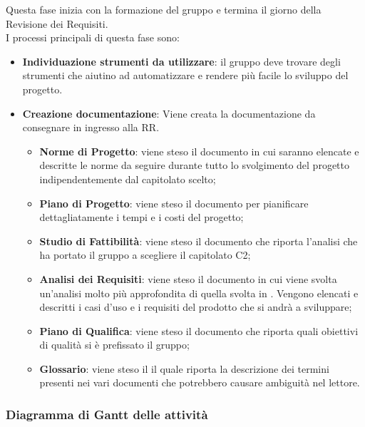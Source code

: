 	Questa fase inizia con la formazione del gruppo e termina il giorno della Revisione dei Requisiti. \\
	I processi principali di questa fase sono: 
	\begin{itemize}
		\item \textbf{Individuazione strumenti da utilizzare}: il gruppo deve trovare degli strumenti che aiutino ad automatizzare e rendere più facile lo sviluppo del progetto.
		\item \textbf{Creazione documentazione}: Viene creata la documentazione da consegnare in ingresso alla RR.
		\att
		\begin{itemize}
			\item \textbf{Norme di Progetto}: viene steso il documento \NPdocRR in cui saranno elencate e descritte le norme da seguire durante tutto lo svolgimento del progetto indipendentemente dal capitolato scelto;
			\item \textbf{Piano di Progetto}: viene steso il documento \PPdocRR per pianificare dettagliatamente i tempi e i costi del progetto;
			\item \textbf{Studio di Fattibilità}: viene steso il documento \SFdocRR che riporta l'analisi che ha portato il gruppo a scegliere il capitolato C2;
			\item \textbf{Analisi dei Requisiti}: viene steso il documento \ARdocRR in cui viene svolta un'analisi molto più approfondita di quella svolta in \SFdocRR. Vengono elencati e descritti i casi d'uso e i requisiti del prodotto che si andrà a sviluppare;
			\item \textbf{Piano di Qualifica}: viene steso il documento \PQdocRR che riporta quali obiettivi di qualità si è prefissato il gruppo;
			\item \textbf{Glossario}: viene steso il \GldocRR il quale riporta la descrizione dei termini presenti nei vari documenti che potrebbero causare ambiguità nel lettore.
		\end{itemize}
	\end{itemize}
	
		
		\subsubsection{Diagramma di Gantt delle attività}
		
